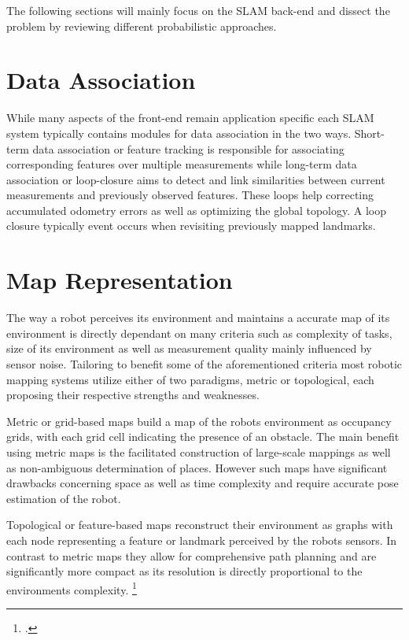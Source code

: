 The following sections will mainly focus on the SLAM back-end and dissect the problem by reviewing different probabilistic approaches. 




\section{Data Association}
While many aspects of the front-end remain application specific each SLAM system typically contains modules for data association in the two ways.
Short-term data association or feature tracking is responsible for associating corresponding features over multiple measurements while long-term data association or loop-closure aims to detect and link similarities between current measurements and previously observed features. These loops help correcting accumulated odometry errors as well as optimizing the global topology. 
A loop closure typically event occurs when revisiting previously mapped landmarks.

\section{Map Representation}
The way a robot perceives its environment and maintains a accurate map of its environment is directly dependant on many criteria such as complexity of tasks, size of its environment as well as measurement quality mainly influenced by sensor noise. 
Tailoring to benefit some of the aforementioned criteria most robotic mapping systems utilize either of two paradigms, metric or topological, each proposing their respective strengths and weaknesses.

Metric or grid-based maps build a map of the robots environment as occupancy grids, with each grid cell indicating the presence of an obstacle. The main benefit using metric maps is the facilitated construction of large-scale mappings as well as non-ambiguous determination of places. However such maps have significant drawbacks concerning space as well as time complexity and require accurate pose estimation of the robot.

Topological or feature-based maps reconstruct their environment as graphs with each node representing a feature or landmark perceived by the robots sensors. In contrast to metric maps they allow for comprehensive path planning and are significantly more compact as its resolution is directly proportional to the environments complexity. \footcite{thrunMaps1998}


